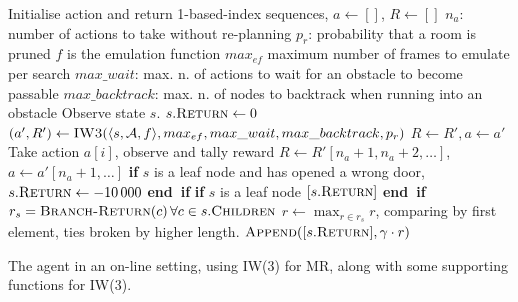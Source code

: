 \begin{algorithm}[hbtp]
\newcommand{\n}[1]{0x#1}
\newcommand{\tn}[1]{\text{0x#1}}
\renewcommand{\r}[1]{ram[\text{0x#1}]}
\begin{algorithmic}
\State Initialise action and return 1-based-index sequences,
$a \gets []$, $R \gets []$
\State $n_a$: number of actions to take without re-planning
\State $p_r$: probability that a room is pruned
\State $f$ is the emulation function
\State $max_{ef}$ maximum number of frames to emulate per search
\State $max\_wait$: max. n. of actions to wait for an obstacle to become passable
\State $max\_backtrack$: max. n. of nodes to backtrack when running into an obstacle
  \Repeat
    \State Observe state $s$.
    \State $s.\textsc{Return} \gets 0$
    \State $(a', R') \gets \Call{IW3}{\langle s, \mathcal{A}, f \rangle,
      max_{ef}, max\_wait, max\_backtrack, p_r}$
      \State $R \gets R', a \gets a'$
    \EndIf
      \State Take action $a[i]$, observe and tally reward
    \EndFor
    \State $R \gets R'[n_a+1,n_a+2,\dots]$, $a \gets a'[n_a+1,\dots]$
\EndProcedure
{}
\State \textbf{if} $s$ is a leaf node and has opened a wrong door,
$s.\textsc{Return} \gets -10\,000$ \textbf{end~if}
\State \textbf{if} $s$ is a leaf node \Return $[s.\textsc{Return}]$ \textbf{end~if}
\State $r_s = \Call{Branch-Return}{c} \, \forall c \in s.\textsc{Children}$
\State $r \gets \max_{r\in r_s} r$, comparing by first element, ties broken by
higher length.
\State \Return $\Call{Append}{[s.\textsc{Return}], \gamma \cdot r}$
\EndFunction
\end{algorithmic}
\caption{The agent in an on-line setting, using \ac{IW}(3) for \acl{MR}, along
with some supporting functions for \ac{IW}(3).}
\label{alg:online-setting}
\end{algorithm}

